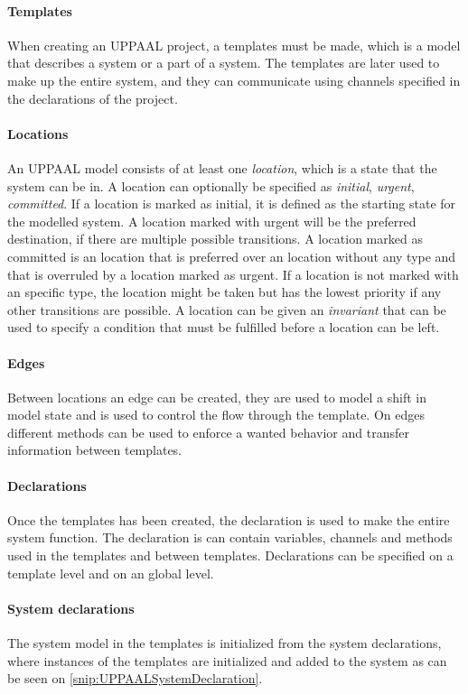 \paragraph{Templates}
When creating an UPPAAL project, a templates must be made, which is a model that describes a system or a part of a system.  
The templates are later used to make up the entire system, and they can communicate using channels specified in the declarations of the project.

\paragraph{Locations}
An UPPAAL model consists of at least one \textit{location}, which is a state that the system can be in. 
A location can optionally be specified as \textit{initial}, \textit{urgent}, \textit{committed}. 
If a location is marked as initial, it is defined as the starting state for the modelled system. 
A location marked with urgent will be the preferred destination, if there are multiple possible transitions. 
A location marked as committed is an location that is preferred over an location without any type and that is overruled by a location marked as urgent. 
If a location is not marked with an specific type, the location might be taken but has the lowest priority if any other transitions are possible. 
A location can be given an \textit{invariant} that can be used to specify a condition that must be fulfilled before a location can be left. 

\paragraph{Edges}
Between locations an edge can be created, they are used to model a shift in model state and is used to control the flow through the template. 
On edges different methods can be used to enforce a wanted behavior and transfer information between templates. 

\paragraph{Declarations}
Once the templates has been created, the declaration is used to make the entire system function. 
The declaration is can contain variables, channels and methods used in the templates and between templates. 
Declarations can be specified on a template level and on an global level. 

\paragraph{System declarations}
The system model in the templates is initialized from the system declarations, where instances of the templates are initialized and added to the system as can be seen on \autoref{snip:UPPAALSystemDeclaration}. 


